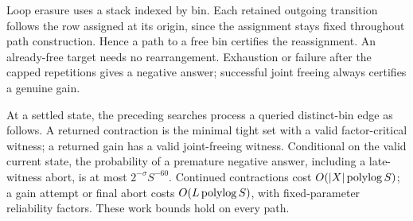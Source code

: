 Loop erasure uses a stack indexed by bin.  Each retained outgoing
transition follows the row assigned at its origin, since the
assignment stays fixed throughout path construction.  Hence a path
to a free bin certifies the reassignment.  An already-free target
needs no rearrangement.  Exhaustion or failure after the capped
repetitions gives a negative answer; successful joint freeing
always certifies a genuine gain.

\begin{lemma}
\label{match:pair-action}
At a settled state, the preceding searches process a queried
distinct-bin edge as follows.  A returned contraction is the minimal
tight set with a valid factor-critical witness; a returned gain has
a valid joint-freeing witness.  Conditional on the valid current
state, the probability of a premature negative answer, including
a late-witness abort, is at most \(2^{-\sigma}S^{-60}\).
Continued contractions cost \(O(|X|\operatorname{polylog} S)\); a gain attempt
or final abort costs \(O(L\operatorname{polylog} S)\), with fixed-parameter
reliability factors.  These work bounds hold on every path.
\end{lemma}
